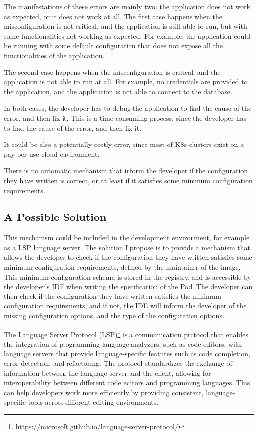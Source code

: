 \documentclass[
  11pt,
]{article}
\DeclareRobustCommand{\href}[2]{#2\footnote{\url{#1}}}
\begin{document}
The manifestations of these errors are mainly two: the application does
not work as expected, or it does not work at all. The first case happens
when the misconfiguration is not critical, and the application is still
able to run, but with some functionalities not working as expected. For
example, the application could be running with some default
configuration that does not expose all the functionalities of the
application.

The second case happens when the misconfiguration is critical, and the
application is not able to run at all. For example, no credentials are
provided to the application, and the application is not able to connect
to the database.

In both cases, the developer has to debug the application to find the
cause of the error, and then fix it. This is a time consuming process,
since the developer has to find the cause of the error, and then fix it.

It could be also a potentially costly error, since most of K8s clusters
exist on a pay-per-use cloud environment.

There is no automatic mechanism that inform the developer if the
configuration they have written is correct, or at least if it satisfies
some minimum configuration requirements.

\hypertarget{a-possible-solution}{%
\subsection{A Possible Solution}\label{a-possible-solution}}

This mechanism could be included in the development environment, for
example as a LSP language server. The solution I propose is to provide a
mechanism that allows the developer to check if the configuration they
have written satisfies some minimum configuration requirements, defined
by the maintainer of the image. This minimum configuration schema is
stored in the registry, and is accessible by the developer's IDE when
writing the specification of the Pod. The developer can then check if
the configuration they have written satisfies the minimum configuration
requirements, and if not, the IDE will inform the developer of the
missing configuration options, and the type of the configuration
options.

The
\href{https://microsoft.github.io/language-server-protocol/}{Language
Server Protocol (LSP)} is a communication protocol that enables the
integration of programming language analyzers, such as code editors,
with language servers that provide language-specific features such as
code completion, error detection, and refactoring. The protocol
standardizes the exchange of information between the language server and
the client, allowing for interoperability between different code editors
and programming languages. This can help developers work more
efficiently by providing consistent, language-specific tools across
different editing environments.
\end{document}
